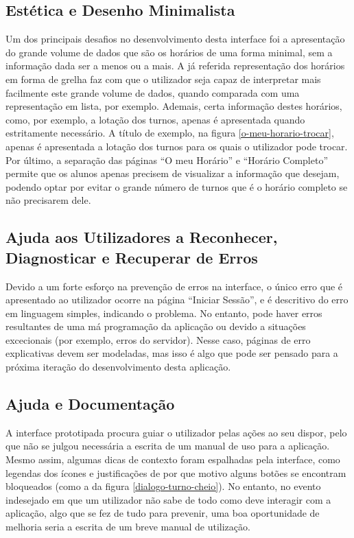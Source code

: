 \documentclass[12pt, a4paper]{article}
\begin{document}
\subsection{Estética e Desenho Minimalista}

Um dos principais desafios no desenvolvimento desta interface foi a apresentação do grande volume de
dados que são os horários de uma forma minimal, sem a informação dada ser a menos ou a mais. A já
referida representação dos horários em forma de grelha faz com que o utilizador seja capaz de
interpretar mais facilmente este grande volume de dados, quando comparada com uma representação em
lista, por exemplo. Ademais, certa informação destes horários, como, por exemplo, a lotação dos
turnos, apenas é apresentada quando estritamente necessário. A título de exemplo, na figura
\ref{o-meu-horario-trocar}, apenas é apresentada a lotação dos turnos para os quais o utilizador
pode trocar. Por último, a separação das páginas ``O meu Horário'' e ``Horário Completo'' permite
que os alunos apenas precisem de visualizar a informação que desejam, podendo optar por evitar o
grande número de turnos que é o horário completo se não precisarem dele.

\subsection{Ajuda aos Utilizadores a Reconhecer, Diagnosticar e Recuperar de Erros}

Devido a um forte esforço na prevenção de erros na interface, o único erro que é apresentado ao
utilizador ocorre na página ``Iniciar Sessão'', e é descritivo do erro em linguagem simples,
indicando o problema. No entanto, pode haver erros resultantes de uma má programação da aplicação
ou devido a situações excecionais (por exemplo, erros do servidor). Nesse caso, páginas de erro
explicativas devem ser modeladas, mas isso é algo que pode ser pensado para a próxima iteração do
desenvolvimento desta aplicação.

\subsection{Ajuda e Documentação}

A interface prototipada procura guiar o utilizador pelas ações ao seu dispor, pelo que não se
julgou necessária a escrita de um manual de uso para a aplicação. Mesmo assim, algumas dicas de
contexto foram espalhadas pela interface, como legendas dos ícones e justificações de por que motivo
alguns botões se encontram bloqueados (como a da figura \ref{dialogo-turno-cheio}). No entanto, no
evento indesejado em que um utilizador não sabe de todo como deve interagir com a aplicação, algo
que se fez de tudo para prevenir, uma boa oportunidade de melhoria seria a escrita de um breve
manual de utilização.
\end{document}
